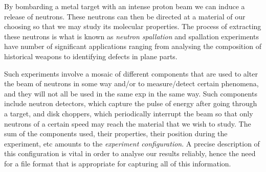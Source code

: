 By bombarding a metal target with an intense proton beam we can induce a release of neutrons. These neutrons can then be directed at a material of our choosing so that we may study its molecular properties. The process of extracting these neutrons is what is known as \textit{neutron spallation} and spallation experiments have number of significant applications ranging from analysing the composition of historical weapons to identifying defects in plane parts.

Such experiments involve a mosaic of different components that are used to alter the beam of neutrons in some way and/or to measure/detect certain phenomena, and they will not all be used in the same exp in the same way. Such components include neutron detectors, which capture the pulse of energy after going through a target, and disk choppers, which periodically interrupt the beam so that only neutrons of a certain speed may reach the material that we wish to study. The sum of the components used, their properties, their position during the experiment, etc amounts to the \textit{experiment configuration}. A precise description of this configuration is vital in order to analyse our results reliably, hence the need for a file format that is appropriate for capturing all of this information.
